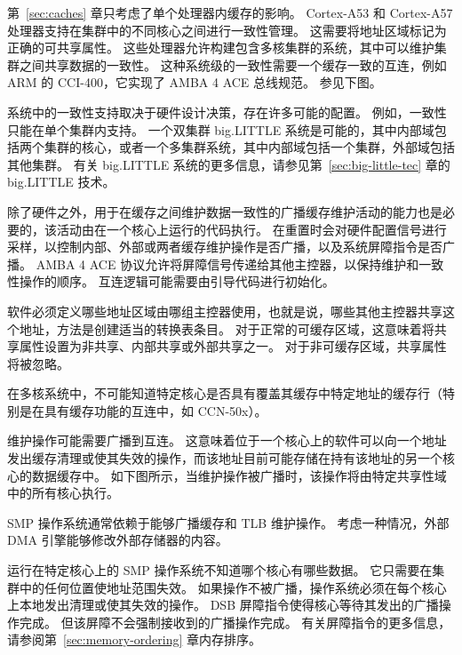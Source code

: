 第~\ref{sec:caches} 章只考虑了单个处理器内缓存的影响。
Cortex-A53 和 Cortex-A57 处理器支持在集群中的不同核心之间进行一致性管理。
这需要将地址区域标记为正确的可共享属性。
这些处理器允许构建包含多核集群的系统，其中可以维护集群之间共享数据的一致性。
这种系统级的一致性需要一个缓存一致的互连，例如 ARM 的 CCI-400，它实现了 AMBA 4 ACE 总线规范。
参见下图。


系统中的一致性支持取决于硬件设计决策，存在许多可能的配置。
例如，一致性只能在单个集群内支持。
一个双集群 big.LITTLE 系统是可能的，其中内部域包括两个集群的核心，或者一个多集群系统，其中内部域包括一个集群，外部域包括其他集群。
有关 big.LITTLE 系统的更多信息，请参见第~\ref{sec:big-little-tec} 章的 big.LITTLE 技术。

除了硬件之外，用于在缓存之间维护数据一致性的广播缓存维护活动的能力也是必要的，该活动由在一个核心上运行的代码执行。
在重置时会对硬件配置信号进行采样，以控制内部、外部或两者缓存维护操作是否广播，以及系统屏障指令是否广播。
AMBA 4 ACE 协议允许将屏障信号传递给其他主控器，以保持维护和一致性操作的顺序。
互连逻辑可能需要由引导代码进行初始化。

软件必须定义哪些地址区域由哪组主控器使用，也就是说，哪些其他主控器共享这个地址，方法是创建适当的转换表条目。
对于正常的可缓存区域，这意味着将共享属性设置为非共享、内部共享或外部共享之一。
对于非可缓存区域，共享属性将被忽略。

在多核系统中，不可能知道特定核心是否具有覆盖其缓存中特定地址的缓存行（特别是在具有缓存功能的互连中，如 CCN-50x）。

维护操作可能需要广播到互连。
这意味着位于一个核心上的软件可以向一个地址发出缓存清理或使其失效的操作，而该地址目前可能存储在持有该地址的另一个核心的数据缓存中。
如下图所示，当维护操作被广播时，该操作将由特定共享性域中的所有核心执行。


SMP 操作系统通常依赖于能够广播缓存和 TLB 维护操作。
考虑一种情况，外部 DMA 引擎能够修改外部存储器的内容。

运行在特定核心上的 SMP 操作系统不知道哪个核心有哪些数据。
它只需要在集群中的任何位置使地址范围失效。
如果操作不被广播，操作系统必须在每个核心上本地发出清理或使其失效的操作。
DSB 屏障指令使得核心等待其发出的广播操作完成。
但该屏障不会强制接收到的广播操作完成。
有关屏障指令的更多信息，请参阅第~\ref{sec:memory-ordering} 章内存排序。

